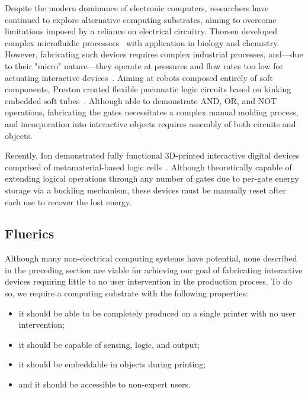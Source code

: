         Despite the modern dominance of electronic computers, researchers
        have continued to explore alternative computing substrates, aiming
        to overcome limitations imposed by a reliance on electrical
        circuitry. Thorsen \etal developed complex microfluidic
        processors~\cite{Thorsen:2002} with application in biology and
        chemistry. However, fabricating such devices requires complex
        industrial processes, and—due to their "micro" nature—they operate
        at pressures and flow rates too low for actuating interactive
        devices~\cite{Thorsen:2002}. Aiming at robots composed entirely of
        soft components, Preston \etal created flexible pneumatic logic
        circuits based on kinking embedded soft tubes~\cite{Preston:2019b}.
        Although able to demonstrate AND, OR, and NOT operations,
        fabricating the gates necessitates a complex manual molding
        process, and incorporation into interactive objects requires
        assembly of both circuits and objects.
        
        Recently, Ion \etal demonstrated fully functional 3D-printed
        interactive digital devices comprised of metamaterial-based logic
        cells~\cite{Ion:2017}. Although theoretically capable of extending
        logical operations through any number of gates due to per-gate
        energy storage via a buckling mechanism, these devices must be
        manually reset after each use to recover the lost energy.

      \subsection{Fluerics}\label{sec:fluerics}
        Although many non-electrical computing systems have potential, none
        described in the preceding section are viable for achieving our
        goal of fabricating interactive devices requiring little to no user
        intervention in the production process. To do so, we require a
        computing substrate with the following properties:

        \begin{itemize}
          \item it should be able to be completely produced on a single
            printer with no user intervention;
          \item it should be capable of sensing, logic, and output;
          \item it should be embeddable in objects during printing;
          \item and it should be accessible to non-expert users.
        \end{itemize}
        
